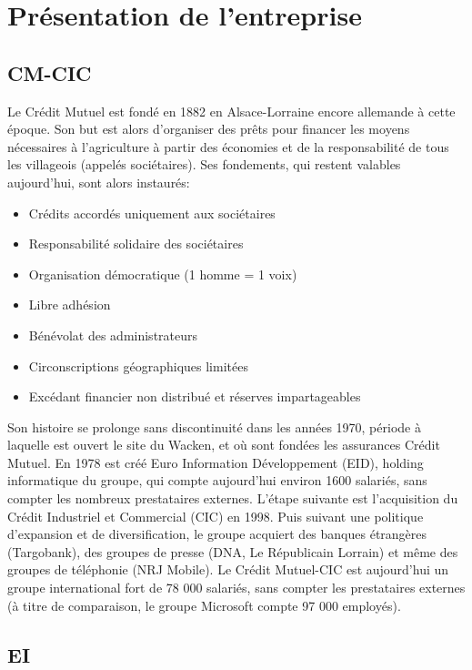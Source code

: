\documentclass[a4paper,french,8pt]{article}
\begin{document}
\section{Présentation de l'entreprise}

	\subsection{CM-CIC}
	
		Le Crédit Mutuel est fondé en 1882 en Alsace-Lorraine encore allemande à cette époque. 
		Son but est alors d’organiser des prêts pour financer les moyens nécessaires à l’agriculture à partir des économies et de la responsabilité de tous les villageois (appelés sociétaires).
		Ses fondements, qui restent valables aujourd'hui, sont alors instaurés:
		
		\begin{itemize}
			\item Crédits accordés uniquement aux sociétaires
			\item Responsabilité solidaire des sociétaires
			\item Organisation démocratique (1 homme = 1 voix)
			\item Libre adhésion
			\item Bénévolat des administrateurs
			\item Circonscriptions géographiques limitées
			\item Excédant financier non distribué et réserves impartageables
		\end{itemize}

		Son histoire se prolonge sans discontinuité dans les années 1970, période à laquelle est ouvert le site du Wacken, et où sont fondées les assurances Crédit Mutuel.
		En 1978 est créé Euro Information Développement (EID), holding informatique du groupe, qui compte aujourd’hui environ 1600 salariés, sans compter les nombreux prestataires externes.
		L’étape suivante est l’acquisition du Crédit Industriel et Commercial (CIC) en 1998. 
		Puis suivant une politique d’expansion et de diversification, le groupe acquiert des banques étrangères (Targobank), des groupes de presse (DNA, Le Républicain Lorrain) et même des groupes de téléphonie (NRJ Mobile).
		Le Crédit Mutuel-CIC est aujourd’hui un groupe international fort de 78 000 salariés, sans compter les prestataires externes (à titre de comparaison, le groupe Microsoft compte 97 000 employés).

	\subsection{EI}
	
\end{document}
